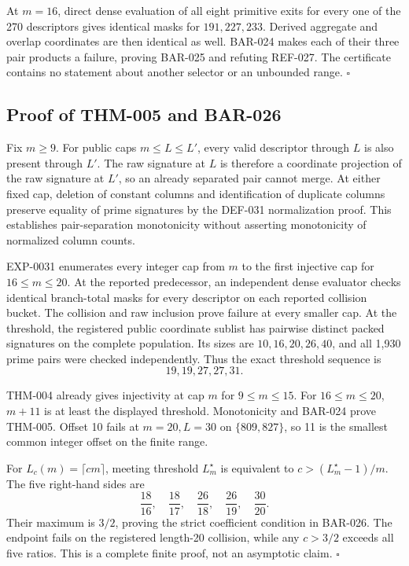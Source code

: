 \documentclass[11pt]{article}
\begin{document}
At \(m=16\), direct dense evaluation of all eight primitive exits for every
one of the 270 descriptors gives identical masks for \(191,227,233\).
Derived aggregate and overlap coordinates are then identical as well.
BAR-024 makes each of their three pair products a failure, proving BAR-025
and refuting REF-027. The certificate contains no statement about another
selector or an unbounded range. \(\square\)

\subsection{Proof of THM-005 and BAR-026}
\label{proof:THM-005-BAR-026}

Fix \(m\ge9\). For public caps \(m\le L\le L'\), every valid descriptor
through \(L\) is also present through \(L'\). The raw signature at \(L\) is
therefore a coordinate projection of the raw signature at \(L'\), so an
already separated pair cannot merge. At either fixed cap, deletion of
constant columns and identification of duplicate columns preserve equality
of prime signatures by the DEF-031 normalization proof. This establishes
pair-separation monotonicity without asserting monotonicity of normalized
column counts.

EXP-0031 enumerates every integer cap from \(m\) to the first injective cap
for \(16\le m\le20\). At the reported predecessor, an independent dense
evaluator checks identical branch-total masks for every descriptor on each
reported collision bucket. The collision and raw inclusion prove failure at
every smaller cap. At the threshold, the registered public coordinate
sublist has pairwise distinct packed signatures on the complete population.
Its sizes are \(10,16,20,26,40\), and all 1,930 prime pairs were checked
independently. Thus the exact threshold sequence is
\[
19,19,27,27,31.
\]

THM-004 already gives injectivity at cap \(m\) for \(9\le m\le15\).
For \(16\le m\le20\), \(m+11\) is at least the displayed threshold.
Monotonicity and BAR-024 prove THM-005. Offset 10 fails at
\(m=20,L=30\) on \(\{809,827\}\), so 11 is the smallest common integer
offset on the finite range.

For \(L_c(m)=\lceil cm\rceil\), meeting threshold \(L_m^\star\) is
equivalent to \(c>(L_m^\star-1)/m\). The five right-hand sides are
\[
\frac{18}{16},\quad\frac{18}{17},\quad\frac{26}{18},\quad
\frac{26}{19},\quad\frac{30}{20}.
\]
Their maximum is \(3/2\), proving the strict coefficient condition in
BAR-026. The endpoint fails on the registered length-20 collision, while
any \(c>3/2\) exceeds all five ratios. This is a complete finite proof, not
an asymptotic claim. \(\square\)
\end{document}
